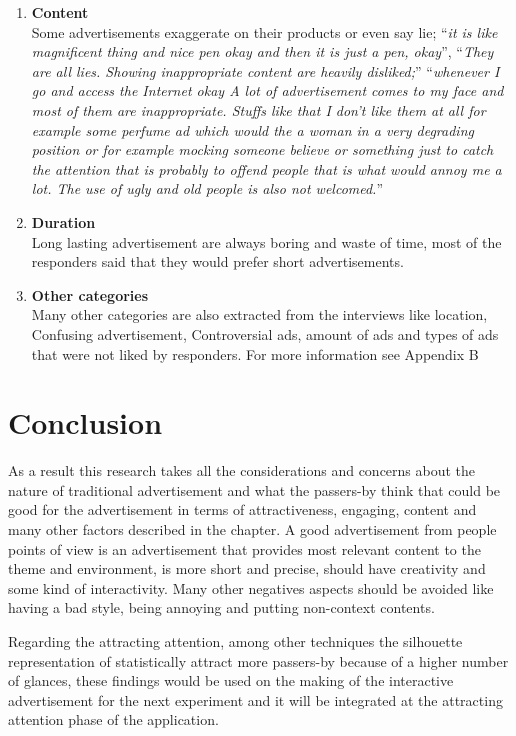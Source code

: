 \begin{enumerate}
\item \textbf{Content} \\
Some advertisements exaggerate on their products or even say lie; ``\emph{it is like magnificent thing and nice pen okay and then it is just a pen, okay}'', ``\emph{They are all lies. Showing inappropriate content are heavily disliked;}'' ``\emph{whenever I go and access the Internet okay A lot of advertisement comes to my face and most of them are inappropriate.
Stuffs like that I don't like them at all for example some perfume ad which would the a woman in a very degrading position or for example mocking someone believe or something just to catch the attention that is probably to offend people that is what would annoy me a lot. The use of ugly and old people is also not welcomed.}''

\item \textbf{Duration} \\
Long lasting advertisement are always boring and waste of time, most of the responders said that they would prefer short advertisements.

\item \textbf{Other categories} \\
Many other categories are also extracted from the interviews like location, Confusing advertisement, Controversial ads, amount of ads and types of ads that were not liked by responders. For more information see Appendix B

\end{enumerate}

\section{Conclusion} 
As a result this research takes all the considerations and concerns about the nature of traditional advertisement and what the passers-by think that could be good for the advertisement in terms of attractiveness, engaging, content and many other factors described in the chapter. A good advertisement from people points of view is an advertisement that provides most relevant content to the theme and environment, is more short and precise, should have creativity and some kind of interactivity. Many other negatives aspects should be avoided like having a bad style, being annoying and putting non-context contents.

Regarding the attracting attention, among other techniques the silhouette representation of statistically attract more passers-by because of a higher number of glances, these findings would be used on the making of the interactive advertisement for the next experiment and it will be integrated at the attracting attention phase of the application.


